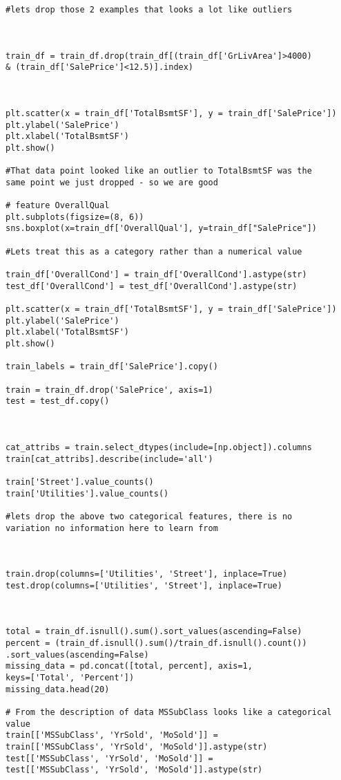 \documentclass[12pt]{article}%
\begin{document}
\begin{lstlisting}
#lets drop those 2 examples that looks a lot like outliers



train_df = train_df.drop(train_df[(train_df['GrLivArea']>4000) 
& (train_df['SalePrice']<12.5)].index)



plt.scatter(x = train_df['TotalBsmtSF'], y = train_df['SalePrice'])
plt.ylabel('SalePrice')
plt.xlabel('TotalBsmtSF')
plt.show()

#That data point looked like an outlier to TotalBsmtSF was the
same point we just dropped - so we are good

# feature OverallQual
plt.subplots(figsize=(8, 6))
sns.boxplot(x=train_df['OverallQual'], y=train_df["SalePrice"])

#Lets treat this as a category rather than a numerical value

train_df['OverallCond'] = train_df['OverallCond'].astype(str)
test_df['OverallCond'] = test_df['OverallCond'].astype(str)

plt.scatter(x = train_df['TotalBsmtSF'], y = train_df['SalePrice'])
plt.ylabel('SalePrice')
plt.xlabel('TotalBsmtSF')
plt.show()

train_labels = train_df['SalePrice'].copy()

train = train_df.drop('SalePrice', axis=1)
test = test_df.copy()



cat_attribs = train.select_dtypes(include=[np.object]).columns
train[cat_attribs].describe(include='all')

train['Street'].value_counts()
train['Utilities'].value_counts()

#lets drop the above two categorical features, there is no 
variation no information here to learn from



train.drop(columns=['Utilities', 'Street'], inplace=True)
test.drop(columns=['Utilities', 'Street'], inplace=True)



total = train_df.isnull().sum().sort_values(ascending=False)
percent = (train_df.isnull().sum()/train_df.isnull().count())
.sort_values(ascending=False)
missing_data = pd.concat([total, percent], axis=1, 
keys=['Total', 'Percent'])
missing_data.head(20)

# From the description of data MSSubClass looks like a categorical value
train[['MSSubClass', 'YrSold', 'MoSold']] =
train[['MSSubClass', 'YrSold', 'MoSold']].astype(str)
test[['MSSubClass', 'YrSold', 'MoSold']] = 
test[['MSSubClass', 'YrSold', 'MoSold']].astype(str)



\end{lstlisting}
\end{document}
